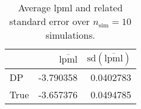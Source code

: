 \begin{table}[H]

\caption{Average lpml and related standard error over $n_{\text{sim}} = 10$ simulations.}
\centering
\begin{tabular}[t]{lrr}
\toprule
  & $\overbar{\text{lpml}}$ & $\text{sd}(\overbar{\text{lpml}})$\\
\midrule
DP & -3.790358 & 0.0402783\\
True & -3.657376 & 0.0494785\\
\bottomrule
\end{tabular}
\end{table}